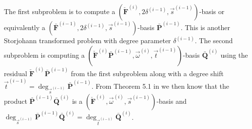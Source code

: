 The first subproblem is to compute a $(\check{\mathbf{F}}^{\left(i\right)},2\delta^{\left(i-1\right)},\vec{s}^{\left(i-1\right)})$-basis
or equivalently a $(\bar{\mathbf{F}}^{\left(i-1\right)},2\delta^{\left(i-1\right)},\vec{s}^{\left(i-1\right)})$-basis
$\bar{\mathbf{P}}^{\left(i-1\right)}$. This is another Storjohann
transformed problem with degree parameter $\delta^{\left(i-1\right)}$.
The second subproblem is computing a $(\check{\mathbf{F}}^{\left(i\right)}\bar{\mathbf{P}}^{\left(i-1\right)},\vec{\omega}^{\left(i\right)},\vec{t}^{\left(i-1\right)})$-basis
$\bar{\mathbf{Q}}^{\left(i\right)}$ using the residual $\check{\mathbf{F}}^{\left(i\right)}\bar{\mathbf{P}}^{\left(i-1\right)}$
from the first subproblem along with a degree shift $\vec{t}^{\left(i-1\right)}=\deg_{\vec{s}^{\left(i-1\right)}}\bar{\mathbf{P}}^{\left(i-1\right)}$.
From Theorem 5.1 in \citep{BL1997} we then know that the product
$\bar{\mathbf{P}}^{\left(i-1\right)}\bar{\mathbf{Q}}^{\left(i\right)}$
is a $(\check{\mathbf{F}}^{\left(i\right)},\vec{\omega}^{\left(i\right)},\vec{s}^{\left(i-1\right)})$-basis
and $\deg_{\vec{s}^{\left(i-1\right)}}\bar{\mathbf{P}}^{\left(i-1\right)}\bar{\mathbf{Q}}^{\left(i\right)}=\deg_{\vec{t}^{\left(i-1\right)}}\bar{\mathbf{Q}}^{\left(i\right)}$. 
